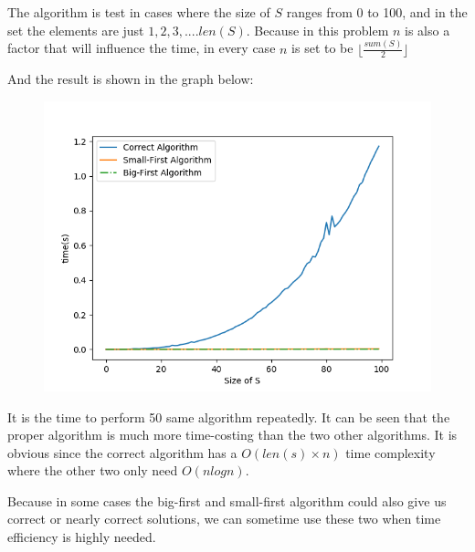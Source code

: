 \documentclass{article}
\begin{document}
The algorithm is test in cases where the size of $S$ ranges from 0 to 100, and in the set the elements are just $1,2,3,....len(S)$. Because in this problem $n$ is also a factor that will influence the time, in every case $n$ is set to be $\lfloor \frac{sum(S)}{2} \rfloor$

And the result is shown in the graph below:

\begin{figure}[h]
    \centering
    \includegraphics[scale=0.5]{1.png}
\end{figure}

It is the time to perform 50 same algorithm repeatedly. It can be seen that the proper algorithm is much more time-costing than the two other algorithms. It is obvious since the correct algorithm has a $O(len(s)\times n)$ time complexity where the other two only need $O(nlogn)$. 

Because in some cases the big-first and small-first algorithm could also give us correct or nearly correct solutions, we can sometime use these two when time efficiency is highly needed.
\end{document}
